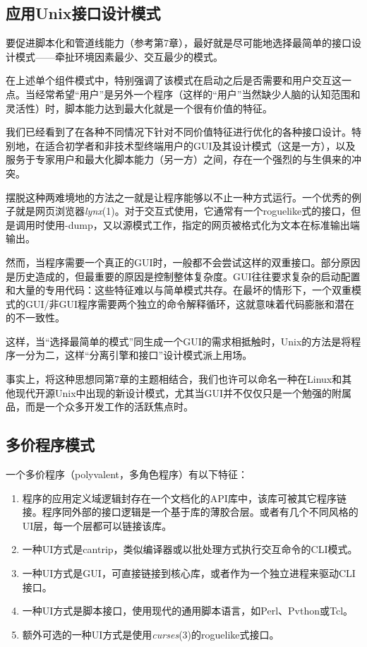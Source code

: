 \documentclass[12pt,oneside]{ctexbook}
\begin{document}
\begin{common-format}
\section{应用Unix接口设计模式}
要促进脚本化和管道线能力（参考第7章），最好就是尽可能地选择最简单的接口设计模式——牵扯环境因素最少、交互最少的模式。

在上述单个组件模式中，特别强调了该模式在启动之后是否需要和用户交互这一点。当经常希望“用户”是另外一个程序（这样的“用户”当然缺少人脑的认知范围和灵活性）时，脚本能力达到最大化就是一个很有价值的特征。

我们已经看到了在各种不同情况下针对不同价值特征进行优化的各种接口设计。特别地，在适合初学者和非技术型终端用户的GUI及其设计模式（这是一方），以及服务于专家用户和最大化脚本能力（另一方）之间，存在一个强烈的与生俱来的冲突。

摆脱这种两难境地的方法之一就是让程序能够以不止一种方式运行。一个优秀的例子就是网页浏览器\textit{lynx}(1)。对于交互式使用，它通常有一个roguelike式的接口，但是调用时使用-dump，又以源模式工作，指定的网页被格式化为文本在标准输出端输出。

然而，当程序需要一个真正的GUI时，一般都不会尝试这样的双重接口。部分原因是历史造成的，但最重要的原因是控制整体复杂度。GUI往往要求复杂的启动配置和大量的专用代码：这些特征难以与简单模式共存。在最坏的情形下，一个双重模式的GUI/非GUI程序需要两个独立的命令解释循环，这就意味着代码膨胀和潜在的不一致性。

这样，当“选择最简单的模式”同生成一个GUI的需求相抵触时，Unix的方法是将程序一分为二，这样“分离引擎和接口”设计模式派上用场。

事实上，将这种思想同第7章的主题相结合，我们也许可以命名一种在Linux和其他现代开源Unix中出现的新设计模式，尤其当GUI并不仅仅只是一个勉强的附属品，而是一个众多开发工作的活跃焦点时。

\subsection{多价程序模式}
一个多价程序（polyvalent，多角色程序）有以下特征：
\begin{enumerate}
\item 程序的应用定义域逻辑封存在一个文档化的API库中，该库可被其它程序链接。程序同外部的接口逻辑是一个基于库的薄胶合层。或者有几个不同风格的UI层，每一个层都可以链接该库。
\item 一种UI方式是cantrip，类似编译器或以批处理方式执行交互命令的CLI模式。
\item 一种UI方式是GUI，可直接链接到核心库，或者作为一个独立进程来驱动CLI接口。
\item 一种UI方式是脚本接口，使用现代的通用脚本语言，如Perl、Pvthon或Tcl。
\item 额外可选的一种UI方式是使用\textit{curses}(3)的roguelike式接口。
\end{enumerate}


\end{common-format}
\end{document}

